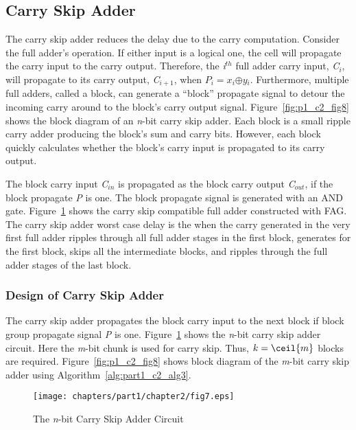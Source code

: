 \subsection{Carry Skip Adder}
The carry skip adder reduces the delay due to the carry computation. Consider the full adder's operation. If either input is a logical one, the cell will propagate the carry input to the carry output. Therefore, the {\it i${}^{th}$} full adder carry input, {\it C${}_{i}$}, will propagate to its carry output, {\it C${}_{i+1}$}, when {\it $P_i = x{}_{i}$$\oplus $$y{}_{i}$}. Furthermore, multiple full adders, called a block, can generate a ``block'' propagate signal to detour the incoming carry around to the block's carry output signal. Figure~\ref{fig:p1_c2_fig8} shows the block diagram of an {\it n}-bit carry skip adder. Each block is a small ripple carry adder producing the block's sum and carry bits. However, each block quickly calculates whether the block's carry input is propagated to its carry output.  

The block carry input {\it C${}_{in}$} is propagated as the block carry output {\it C${}_{out}$}, if the block propagate {\it P} is one. The block propagate signal is generated with an AND gate. Figure~\ref{fig:p1_c2_fig7} shows the carry skip compatible full adder constructed with FAG. The carry skip adder worst case delay is the when the carry generated in the very first full adder ripples through all full adder stages in the first block, generates  for the first block, skips all the intermediate blocks, and ripples through the full adder stages of the last block.

\subsubsection{Design of Carry Skip Adder}
The carry skip adder propagates the block carry input to the next block if block group propagate signal {\it P} is one. Figure~\ref{fig:p1_c2_fig7} shows the {\it n}-bit carry skip adder circuit. Here the {\it m}-bit chunk is used for carry skip. Thus, $k=\ceil{m}$ blocks are required. Figure~\ref{fig:p1_c2_fig8} shows block diagram of the \textit{m}-bit carry skip adder using Algorithm~\ref{alg:part1_c2_alg3}.

\begin{figure}[!tbh]
	\centering
	\texttt{[image: chapters/part1/chapter2/fig7.eps]}
	\caption{The {\it n}-bit Carry Skip Adder Circuit}
	\label{fig:p1_c2_fig7}
\end{figure}


